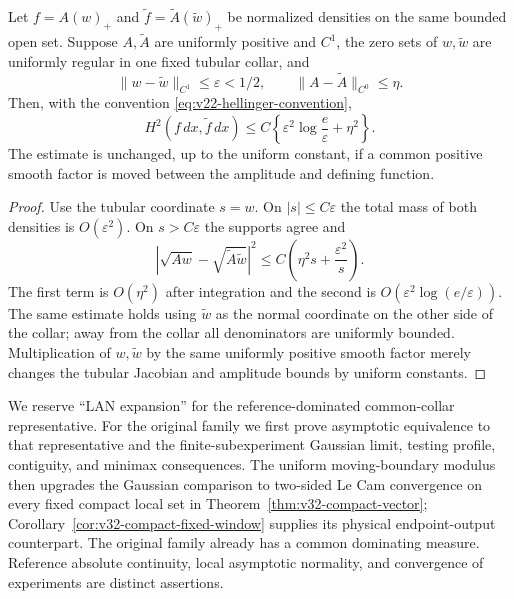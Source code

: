 \begin{lemma}
\label{lem:v22-hypersurface-stability}
Let $f=A(w)_+$ and $\widetilde f=\widetilde A(\widetilde w)_+$ be normalized
densities on the same bounded open set.  Suppose $A,\widetilde A$ are
uniformly positive and $C^1$, the zero sets of $w,\widetilde w$ are uniformly
regular in one fixed tubular collar, and
\[
 \|w-\widetilde w\|_{C^1}\le\varepsilon<1/2,
 \qquad
 \|A-\widetilde A\|_{C^0}\le\eta.
\]
Then, with the convention \eqref{eq:v22-hellinger-convention},
\begin{equation}\label{eq:v22-hypersurface-stability}
 H^2(f\,dx,\widetilde f\,dx)
 \le C\left\{\varepsilon^2\log\frac e\varepsilon+\eta^2\right\}.
\end{equation}
The estimate is unchanged, up to the uniform constant, if a common positive
smooth factor is moved between the amplitude and defining function.
\end{lemma}

\begin{proof}
Use the tubular coordinate $s=w$.  On $|s|\le C\varepsilon$ the total mass of
both densities is $O(\varepsilon^2)$.  On $s>C\varepsilon$ the supports agree
and
\[
 |\sqrt{Aw}-\sqrt{\widetilde A\widetilde w}|^2
 \le C\left(\eta^2s+\frac{\varepsilon^2}{s}\right).
\]
The first term is $O(\eta^2)$ after integration and the second is
$O(\varepsilon^2\log(e/\varepsilon))$.  The same estimate holds using
$\widetilde w$ as the normal coordinate on the other side of the collar;
away from the collar all denominators are uniformly bounded.  Multiplication
of $w,\widetilde w$ by the same uniformly positive smooth factor merely
changes the tubular Jacobian and amplitude bounds by uniform constants.
\end{proof}

\begin{remark}[Terminology]
We reserve ``LAN expansion'' for the reference-dominated common-collar representative.
For the original family we first prove asymptotic equivalence to that
representative and the finite-subexperiment Gaussian limit, testing profile,
contiguity, and minimax consequences.  The uniform moving-boundary modulus
then upgrades the Gaussian comparison to two-sided Le Cam convergence on
every fixed compact local set in Theorem~\ref{thm:v32-compact-vector};
Corollary~\ref{cor:v32-compact-fixed-window} supplies its physical
endpoint-output counterpart.  The original family already has a common
dominating measure.
Reference absolute continuity, local asymptotic normality, and convergence
of experiments are distinct assertions.
\end{remark}